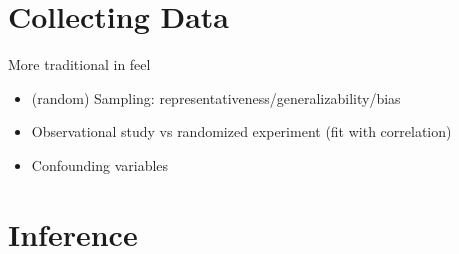 \documentclass[]{tufte-book}
\providecommand{\tightlist}{%
  \setlength{\itemsep}{0pt}\setlength{\parskip}{0pt}}
\begin{document}
\chapter{Collecting Data}\label{collect}

More traditional in feel

\begin{itemize}
\tightlist
\item
  (random) Sampling: representativeness/generalizability/bias
\item
  Observational study vs randomized experiment (fit with correlation)
\item
  Confounding variables
\end{itemize}

\chapter{Inference}\label{infer}
\end{document}
